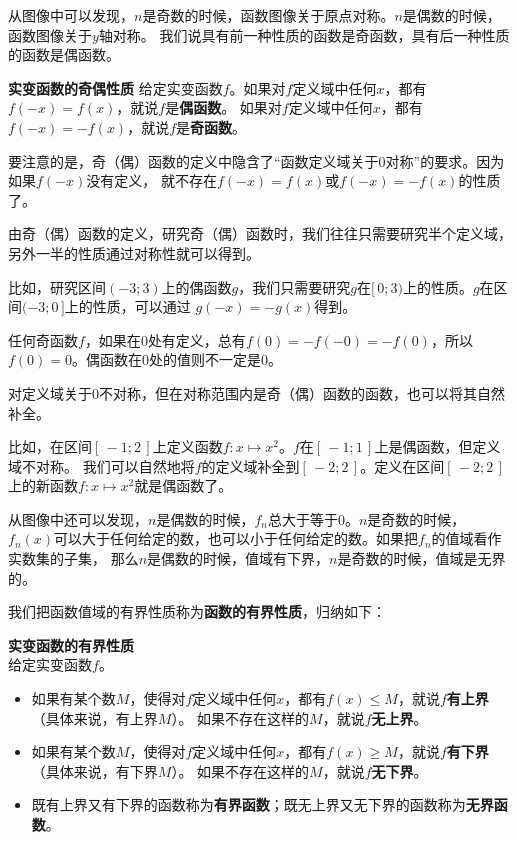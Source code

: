 \documentclass[12pt,UTF8]{ctexbook}
\begin{document}
从图像中可以发现，$n$是奇数的时候，函数图像关于原点对称。$n$是偶数的时候，函数图像关于$y$轴对称。
我们说具有前一种性质的函数是奇函数，具有后一种性质的函数是偶函数。
\begin{df}\textbf{实变函数的奇偶性质}
    给定实变函数$f$。如果对$f$定义域中任何$x$，都有$f(-x) = f(x)$，就说$f$是\textbf{偶函数}。
如果对$f$定义域中任何$x$，都有$f(-x) = -f(x)$，就说$f$是\textbf{奇函数}。
\end{df}

要注意的是，奇（偶）函数的定义中隐含了“函数定义域关于$0$对称”的要求。因为如果$f(-x)$没有定义，
就不存在$f(-x) = f(x)$或$f(-x) = -f(x)$的性质了。

由奇（偶）函数的定义，研究奇（偶）函数时，我们往往只需要研究半个定义域，另外一半的性质通过对称性就可以得到。

比如，研究区间$(-3;3)$上的偶函数$g$，我们只需要研究$g$在$[\,0;3)$上的性质。$g$在区间$(-3;0\,]$上的性质，可以通过
$g(-x) = -g(x)$得到。

任何奇函数$f$，如果在$0$处有定义，总有$f(0) = - f(-0) = - f(0)$，所以$f(0) = 0$。偶函数在$0$处的值则不一定是$0$。

对定义域关于$0$不对称，但在对称范围内是奇（偶）函数的函数，也可以将其自然补全。

比如，在区间$[\,-1;2\,]$上定义函数$f: x\mapsto x^2$。$f$在$[\,-1;1\,]$上是偶函数，但定义域不对称。
我们可以自然地将$f$的定义域补全到$[\,-2;2\,]$。定义在区间$[\,-2;2\,]$上的新函数$f: x\mapsto x^2$就是偶函数了。

从图像中还可以发现，$n$是偶数的时候，$f_n$总大于等于$0$。$n$是奇数的时候，
$f_n(x)$可以大于任何给定的数，也可以小于任何给定的数。如果把$f_n$的值域看作实数集的子集，
那么$n$是偶数的时候，值域有下界，$n$是奇数的时候，值域是无界的。

我们把函数值域的有界性质称为\textbf{函数的有界性质}，归纳如下：
\begin{df}\textbf{实变函数的有界性质}\\
    给定实变函数$f$。
    \begin{itemize}
        \item 如果有某个数$M$，使得对$f$定义域中任何$x$，都有$f(x)\leqslant M$，就说$f$\textbf{有上界} （具体来说，有上界$M$）。
        如果不存在这样的$M$，就说$f$\textbf{无上界}。
        \item 如果有某个数$M$，使得对$f$定义域中任何$x$，都有$f(x)\geqslant M$，就说$f$\textbf{有下界} （具体来说，有下界$M$）。
        如果不存在这样的$M$，就说$f$\textbf{无下界}。
        \item 既有上界又有下界的函数称为\textbf{有界函数}；既无上界又无下界的函数称为\textbf{无界函数}。
    \end{itemize}
\end{df}
\end{document}
